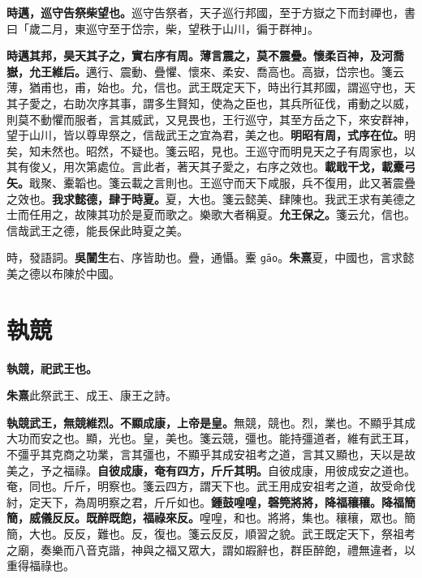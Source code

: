 
\textbf{時邁，巡守告祭柴望也。}{\footnotesize 巡守告祭者，天子巡行邦國，至于方嶽之下而封禪也，書曰「歲二月，東巡守至于岱宗，柴，望秩于山川，徧于群神」。}

\textbf{時邁其邦，昊天其子之，實右序有周。薄言震之，莫不震疊。懷柔百神，及河喬嶽，允王維后。}{\footnotesize 邁行、震動、疊懼、懷來、柔安、喬高也。高嶽，岱宗也。箋云薄，猶甫也，甫，始也。允，信也。武王既定天下，時出行其邦國，謂巡守也，天其子愛之，右助次序其事，謂多生賢知，使為之臣也，其兵所征伐，甫動之以威，則莫不動懼而服者，言其威武，又見畏也，王行巡守，其至方岳之下，來安群神，望于山川，皆以尊卑祭之，信哉武王之宜為君，美之也。}\textbf{明昭有周，式序在位。}{\footnotesize 明矣，知未然也。昭然，不疑也。箋云昭，見也。王巡守而明見天之子有周家也，以其有俊乂，用次第處位。言此者，著天其子愛之，右序之效也。}\textbf{載戢干戈，載櫜弓矢。}{\footnotesize 戢聚、櫜韜也。箋云載之言則也。王巡守而天下咸服，兵不復用，此又著震疊之效也。}\textbf{我求懿德，肆于時夏。}{\footnotesize 夏，大也。箋云懿美、肆陳也。我武王求有美德之士而任用之，故陳其功於是夏而歌之。樂歌大者稱夏。}\textbf{允王保之。}{\footnotesize 箋云允，信也。信哉武王之德，能長保此時夏之美。}

\begin{quoting}時，發語詞。\textbf{吳闓生}右、序皆助也。疊，通懾。櫜 \texttt{gāo}。\textbf{朱熹}夏，中國也，言求懿美之德以布陳於中國。\end{quoting}

\section{執競}


\textbf{執競，祀武王也。}

\begin{quoting}\textbf{朱熹}此祭武王、成王、康王之詩。\end{quoting}

\textbf{執競武王，無競維烈。不顯成康，上帝是皇。}{\footnotesize 無競，競也。烈，業也。不顯乎其成大功而安之也。顯，光也。皇，美也。箋云競，彊也。能持彊道者，維有武王耳，不彊乎其克商之功業，言其彊也，不顯乎其成安祖考之道，言其又顯也，天以是故美之，予之福祿。}\textbf{自彼成康，奄有四方，斤斤其明。}{\footnotesize 自彼成康，用彼成安之道也。奄，同也。斤斤，明察也。箋云四方，謂天下也。武王用成安祖考之道，故受命伐紂，定天下，為周明察之君，斤斤如也。}\textbf{鍾鼓喤喤，磬筦將將，降福穰穰。降福簡簡，威儀反反。既醉既飽，福祿來反。}{\footnotesize 喤喤，和也。將將，集也。穰穰，眾也。簡簡，大也。反反，難也。反，復也。箋云反反，順習之貌。武王既定天下，祭祖考之廟，奏樂而八音克諧，神與之福又眾大，謂如嘏辭也，群臣醉飽，禮無違者，以重得福祿也。}

